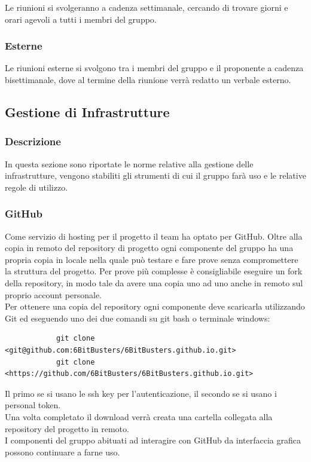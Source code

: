         Le riunioni si svolgeranno a cadenza settimanale, cercando di trovare giorni e orari agevoli a tutti i
        membri del gruppo.

        \subsubsection{Esterne}
        Le riunioni esterne si svolgono tra i membri del gruppo e il proponente a cadenza bisettimanale,
        dove al termine della riunione verrà redatto un verbale esterno.

    \subsection{Gestione di Infrastrutture}
        \subsubsection{Descrizione}
        In questa sezione sono riportate le norme relative alla gestione delle infrastrutture, vengono stabiliti gli
        strumenti di cui il gruppo farà uso e le relative regole di utilizzo.

        \subsubsection{GitHub}
        Come servizio di hosting per il progetto il team ha optato per GitHub. 
        Oltre alla copia in remoto del repository di progetto ogni componente del gruppo ha una propria
        copia in locale nella quale può testare e fare prove senza compromettere la struttura del progetto.
        Per prove più complesse è consigliabile eseguire un fork della repository, in modo tale da avere una copia uno ad uno anche in 
        remoto sul proprio account personale.\\
        Per ottenere una copia del repository ogni componente deve scaricarla utilizzando Git ed eseguendo uno dei due comandi 
        su git bash o terminale windows:
        \begin{verbatim}
            git clone <git@github.com:6BitBusters/6BitBusters.github.io.git>
            git clone <https://github.com/6BitBusters/6BitBusters.github.io.git>
        \end{verbatim}
        Il primo se si usano le ssh key per l'autenticazione, il secondo se si usano i personal token.\\
        Una volta completato il download verrà creata una cartella collegata alla repository del progetto in remoto.\\
        I componenti del gruppo abituati ad interagire con GitHub da interfaccia grafica possono continuare a
        farne uso.
        
